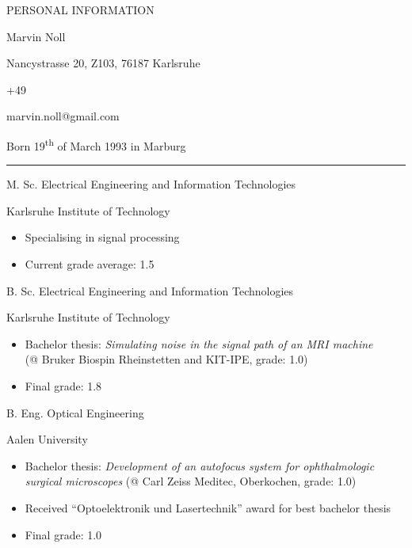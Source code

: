 \documentclass[a4paper,10pt]{article}
\newlength{\cvcolumngapwidth}
\newlength{\cvleftcolumnwidth}
\newlength{\cvrightcolumnwidth}
\newcommand{\cvnamestyle}[1]{{\Large\textcolor{cvnamecolor}{#1}}}
\newcommand{\cvsectionstyle}[1]{{\normalsize\textcolor{cvsectioncolor}{#1}}}
\newcommand{\cvtitlestyle}[1]{{\large\textcolor{cvtitlecolor}{#1}}}
\newcommand{\cvdurationstyle}[1]{{\small\textcolor{cvdurationcolor}{#1}}}
\newlength{\cvafteritemskipamount}
\newlength{\cvaftersectionskipamount}
\newlength{\cvafternameskipamount}
\newlength{\cvafterpersonalinfolineskipamount}
\newlength{\cvaftertitleskipamount}
\newlength{\cvparskip}
\newcommand{\cvpersonalinfo}[2]{
    \begin{minipage}[t]{\cvleftcolumnwidth}
        \vspace{0mm} %
        \raggedleft #1
    \end{minipage}%
    \hspace{\cvcolumngapwidth}%
    \begin{minipage}[t]{\cvrightcolumnwidth}
        \vspace{0mm} %
        #2
    \end{minipage}

    \vspace{\cvafteritemskipamount}
}
\newcommand{\cvname}[1]{
    \cvnamestyle{#1}

    \vspace{\cvafternameskipamount}
}
\newcommand{\cvpersonalinfolinewithicon}[3]{
    \raisebox{.5\fontcharht\font`E-.5\height}{\texttt{[image: \#2]}}
    #3

    \vspace{\cvafterpersonalinfolineskipamount}
}
\newcommand{\cvsection}[1]{
    \begin{minipage}[t][][b]{\cvleftcolumnwidth}
        \raggedleft\cvsectionstyle{#1}
    \end{minipage}%
    \hspace{\cvcolumngapwidth}%
    \begin{minipage}[t]{\cvrightcolumnwidth}
        \textcolor{cvrulecolor}{\rule{\cvrightcolumnwidth}{0.3mm}}
    \end{minipage}

    \vspace{\cvaftersectionskipamount}
}
\newcommand{\cvitem}[2]{
    \begin{minipage}[t]{\cvleftcolumnwidth}
    \strut\vspace*{-\baselineskip}\newline %
    \raggedleft #1
    \end{minipage}%
    \hspace{\cvcolumngapwidth}%
    \begin{minipage}[t]{\cvrightcolumnwidth}
        \setlength{\parskip}{\cvparskip}
        \strut\vspace*{-\baselineskip}\newline #2 %
    \end{minipage}

    \vspace{\cvafteritemskipamount}
}
\newcommand{\cvtitle}[1]{
    \cvtitlestyle{#1}

    \vspace{\cvaftertitleskipamount}
    \vspace{-\cvparskip}
}
\begin{document}
\cvpersonalinfo{
    \cvsectionstyle{PERSONAL INFORMATION}
}{
    \cvname{Marvin Noll}

    \cvpersonalinfolinewithicon{height=4mm}{resources/europasscv-icons/address_europass_icon.pdf}{
        Nancystrasse 20, Z103, 76187 Karlsruhe
    }

    \cvpersonalinfolinewithicon{height=4mm}{resources/europasscv-icons/mobile_europass_icon.pdf}{
        +49\;151\;270\;672\;86
    }

    \cvpersonalinfolinewithicon{height=4mm}{resources/europasscv-icons/mail_europass_icon.pdf}{
        marvin.noll@gmail.com
    }


    Born 19\textsuperscript{th} of March 1993 in Marburg
}

\cvsection{EDUCATION}
\cvitem{\cvdurationstyle{2018 -- now}}{\cvtitle{M. Sc. Electrical Engineering and Information Technologies}
    Karlsruhe Institute of Technology
    \begin{itemize}[leftmargin=*]
        \item Specialising in signal processing
        \item Current grade average: 1.5
    \end{itemize}
}

\cvitem{\cvdurationstyle{2016 -- 2018}}{\cvtitle{B. Sc. Electrical Engineering and Information Technologies}
    Karlsruhe Institute of Technology
    \begin{itemize}[leftmargin=*]
    	\item Bachelor thesis: \textit{Simulating noise in the signal path of an MRI machine}\\(@ Bruker Biospin Rheinstetten and KIT-IPE, grade: 1.0)
        \item Final grade: 1.8
    \end{itemize}
}

\cvitem{\cvdurationstyle{2012 -- 2015}}{\cvtitle{B. Eng. Optical Engineering}
    Aalen University
    \begin{itemize}[leftmargin=*]
    	\item Bachelor thesis: \textit{Development of an autofocus system for ophthalmologic surgical microscopes} (@ Carl Zeiss Meditec, Oberkochen, grade: 1.0)
    	\item Received ``Optoelektronik und Lasertechnik'' award for best bachelor thesis
        \item Final grade: 1.0
    \end{itemize}
}
\end{document}
